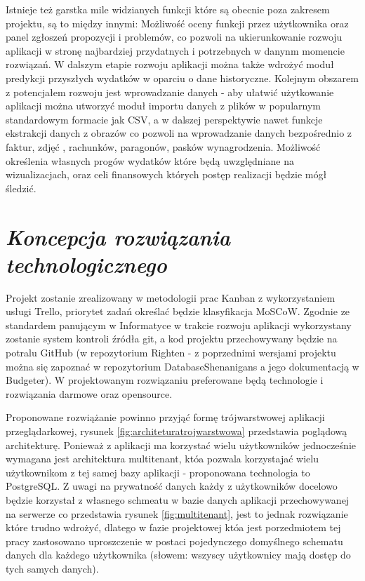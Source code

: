 \documentclass[a4paper,10pt, twoside]{report}
\newcommand{\customstylesection}[1]{\textbf{\textit{#1}}}
\begin{document}
\begin{large}
\medskip
{Istnieje też garstka mile widzianych funkcji które są obecnie poza zakresem 
projektu, są to między innymi: Możliwość oceny funkcji przez 
użytkownika oraz panel zgłoszeń propozycji i problemów, co pozwoli na 
ukierunkowanie rozwoju aplikacji w stronę najbardziej przydatnych i potrzebnych 
w danynm momencie rozwiązań. W dalszym etapie rozwoju aplikacji można także 
wdrożyć moduł predykcji przyszłych wydatków w oparciu o dane historyczne. 
Kolejnym obszarem z potencjałem rozwoju jest wprowadzanie danych - aby ułatwić 
użytkowanie aplikacji można utworzyć moduł importu danych z plików w popularnym 
standardowym formacie jak CSV, a w dalszej perspektywie nawet funkcje ekstrakcji
 danych z obrazów co pozwoli na wprowadzanie danych bezpośrednio z faktur, zdjęć
, rachunków, paragonów, pasków wynagrodzenia. Możliwość określenia własnych 
progów wydatków które będą uwzględniane na wizualizacjach, oraz celi finansowych
 których postęp realizacji będzie mógł śledzić.}

\section{\customstylesection{Koncepcja rozwiązania technologicznego}}
{Projekt zostanie zrealizowany w metodologii prac Kanban\cite{Kanban} z 
wykorzystaniem usługi Trello\cite{Trello}, priorytet zadań określać będzie 
klasyfikacja MoSCoW\cite{MOSCOW}. Zgodnie ze standardem panującym w Informatyce
w trakcie rozwoju aplikacji wykorzystany zostanie system kontroli źródła 
git\cite{GIT}, a kod projektu przechowywany będzie na potralu 
GitHub\cite{GitHub} (w repozytorium Righten\cite{GITRighten} - z poprzednimi 
wersjami projektu można się zapoznać w repozytorium 
DatabaseShenanigans\cite{GITBudgeterApp} a jego dokumentacją w 
Budgeter\cite{GITBudgeterDoc}). W projektowanym rozwiązaniu preferowane będą 
technologie i rozwiązania darmowe oraz opensource.}

\medskip
{Proponowane rozwiążanie powinno przyjąć formę trójwarstwowej aplikacji 
przeglądarkowej, rysunek \ref{fig:architeturatrojwarstwowa} przedstawia 
poglądową architekturę. Ponieważ z aplikacji ma korzystać wielu użytkowników 
jednocześnie wymagana jest architektura multitenant\cite{multitenant}, któa 
pozwala korzystajać wielu użytkownikom z tej samej bazy aplikacji - proponowana 
technologia to PostgreSQL\cite{PostgreSQL}. Z uwagi na prywatność danych każdy 
z użytkowników docelowo będzie korzystał z własnego schmeatu w bazie danych 
aplikacji przechowywanej na serwerze co przedstawia rysunek 
\ref{fig:multitenant}, jest to jednak rozwiązanie które trudno wdrożyć, dlatego 
w fazie projektowej któa jest porzedmiotem tej pracy zastosowano uproszczenie w 
postaci pojedynczego domyślnego schematu danych dla każdego użytkownika 
(słowem: wszyscy użytkownicy mają dostęp do tych samych danych).}


\end{large}
\end{document}
